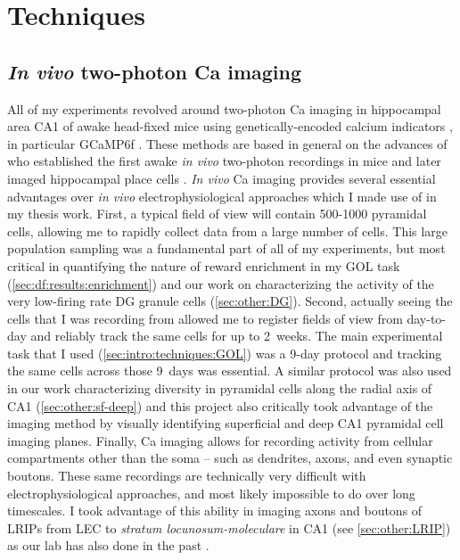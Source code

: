 \acresetall
\chapter{Techniques}
\label{ch:intro:techniques}

\section{\textit{In vivo} two-photon Ca imaging}
All of my experiments revolved around two-photon \citep{Denk1990} Ca imaging in hippocampal area CA1 of awake head-fixed mice \citep{Dombeck2007} using genetically-encoded calcium indicators \citep[GECIs,][]{Knopfel2012}, in particular GCaMP6f \citep{Chen2013}.
These methods are based in general on the advances of \citeauthor{Dombeck2007} who established the first awake \textit{in vivo} two-photon recordings in mice and later imaged hippocampal place cells \citep{Dombeck2010}. 
\textit{In vivo} Ca imaging provides several essential advantages over \emph{in vivo} electrophysiological approaches which I made use of in my thesis work.
First, a typical field of view will contain 500-1000 pyramidal cells, allowing me to rapidly collect data from a large number of cells.
This large population sampling was a fundamental part of all of my experiments, but most critical in quantifying the nature of reward enrichment in my \ac{GOL} task (\autoref{sec:df:results:enrichment}) and our work on characterizing the activity of the very low-firing rate \ac{DG} granule cells (\autoref{sec:other:DG}).
Second, actually seeing the cells that I was recording from allowed me to register fields of view from day-to-day and reliably track the same cells for up to 2~weeks.
The main experimental task that I used (\autoref{sec:intro:techniques:GOL}) was a 9-day protocol and tracking the same cells across those 9~days was essential.
A similar protocol was also used in our work characterizing diversity in pyramidal cells along the radial axis of CA1 (\autoref{sec:other:sf-deep}) and this project also critically took advantage of the imaging method by visually identifying superficial and deep CA1 pyramidal cell imaging planes.
Finally, Ca imaging allows for recording activity from cellular compartments other than the soma -- such as dendrites, axons, and even synaptic boutons.
These same recordings are technically very difficult with electrophysiological approaches, and most likely impossible to do over long timescales.
I took advantage of this ability in imaging axons and boutons of \acp{LRIP} from \ac{LEC} to \textit{stratum locunosum-moleculare} in CA1 (see \autoref{sec:other:LRIP}) as our lab has also done in the past \citep{Kaifosh2013, Lovett-Barron2014}.

